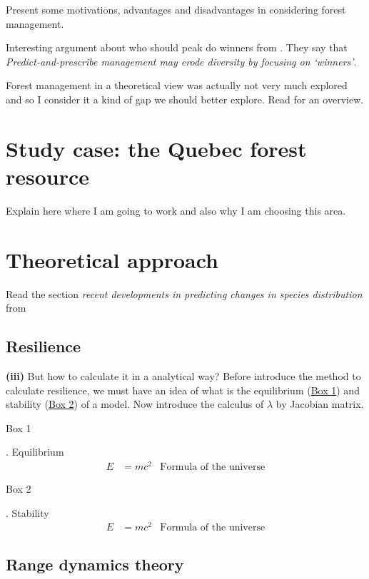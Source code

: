 Present some motivations, advantages and disadvantages in considering forest management.

Interesting argument about who should peak do winners from \cite{Webster2017}. They say that \textit{Predict-and-prescribe management may erode diversity by focusing on ‘winners’}.

Forest management in a theoretical view was actually not very much explored and so I consider it a kind of gap we should better explore. Read \cite{Becknell2015} for an overview.

\section{Study case: the Quebec forest resource}

Explain here where I am going to work and also why I am choosing this area.

\section{Theoretical approach}

Read the section \textit{recent developments in predicting changes in species distribution} from \cite{Ehrlen2015}

\subsection*{Resilience}
\textbf{(iii)} But how to calculate it in a analytical way? Before introduce the method to calculate resilience, we must have an idea of what is the equilibrium (\hyperlink{box1}{Box 1}) and stability (\hyperlink{box2}{Box 2}) of a model. Now introduce the calculus of $\lambda$ by Jacobian matrix.

\begin{tcolorbox}
\hypertarget{box1}{Box 1}. Equilibrium
\begin{align}
E &= mc^2 & \text{Formula of the universe}
\end{align}
\end{tcolorbox}

\begin{tcolorbox}
\hypertarget{box2}{Box 2}. Stability
\begin{align}
E &= mc^2 & \text{Formula of the universe}
\end{align}
\end{tcolorbox}

\subsection*{Range dynamics theory}

